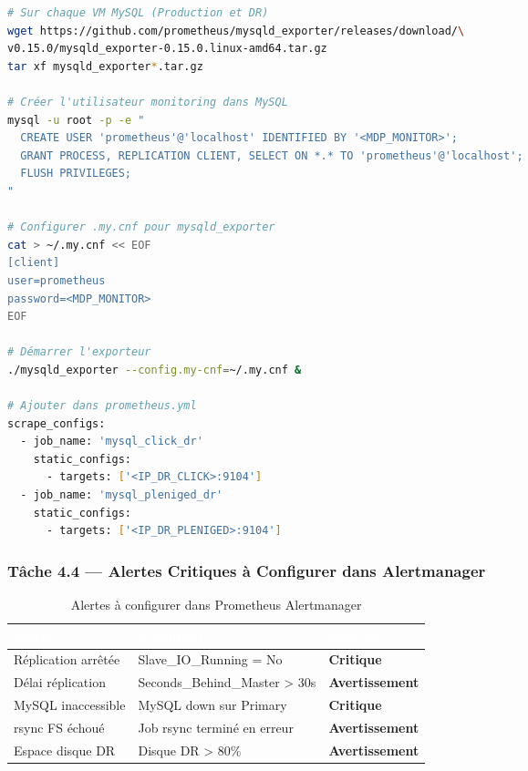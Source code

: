 \documentclass[a4paper,11pt]{article}
\begin{document}
\begin{lstlisting}[language=bash, caption={Installation mysqld\_exporter pour Prometheus}]
# Sur chaque VM MySQL (Production et DR)
wget https://github.com/prometheus/mysqld_exporter/releases/download/\
v0.15.0/mysqld_exporter-0.15.0.linux-amd64.tar.gz
tar xf mysqld_exporter*.tar.gz

# Créer l'utilisateur monitoring dans MySQL
mysql -u root -p -e "
  CREATE USER 'prometheus'@'localhost' IDENTIFIED BY '<MDP_MONITOR>';
  GRANT PROCESS, REPLICATION CLIENT, SELECT ON *.* TO 'prometheus'@'localhost';
  FLUSH PRIVILEGES;
"

# Configurer .my.cnf pour mysqld_exporter
cat > ~/.my.cnf << EOF
[client]
user=prometheus
password=<MDP_MONITOR>
EOF

# Démarrer l'exporteur
./mysqld_exporter --config.my-cnf=~/.my.cnf &

# Ajouter dans prometheus.yml
scrape_configs:
  - job_name: 'mysql_click_dr'
    static_configs:
      - targets: ['<IP_DR_CLICK>:9104']
  - job_name: 'mysql_pleniged_dr'
    static_configs:
      - targets: ['<IP_DR_PLENIGED>:9104']
\end{lstlisting}

\subsubsection{Tâche 4.4 — Alertes Critiques à Configurer dans Alertmanager}

\begin{table}[h!]
\centering
\renewcommand{\arraystretch}{1.4}
\begin{tabular}{|l|l|l|}
\hline
\rowcolor{bnmblue}\textcolor{white}{Alerte} & \textcolor{white}{Condition} & \textcolor{white}{Sévérité} \\
\hline
Réplication arrêtée & Slave\_IO\_Running = No & \textcolor{bnmred}{\textbf{Critique}} \\
\hline
\rowcolor{bnmlightgray}
Délai réplication & Seconds\_Behind\_Master > 30s & \textcolor{bnmwarning}{\textbf{Avertissement}} \\
\hline
MySQL inaccessible & MySQL down sur Primary & \textcolor{bnmred}{\textbf{Critique}} \\
\hline
\rowcolor{bnmlightgray}
rsync FS échoué & Job rsync terminé en erreur & \textcolor{bnmwarning}{\textbf{Avertissement}} \\
\hline
Espace disque DR & Disque DR > 80\% & \textcolor{bnmwarning}{\textbf{Avertissement}} \\
\hline
\end{tabular}
\caption{Alertes à configurer dans Prometheus Alertmanager}
\end{table}
\end{document}
